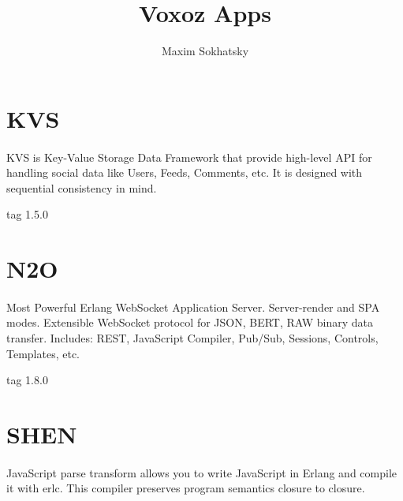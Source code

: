 \documentclass[11pt]{article}
\begin{document}
\title{Voxoz Apps}
\author{Maxim Sokhatsky}


\section*{KVS}
\paragraph{}
KVS is Key-Value Storage Data Framework that provide high-level API for handling
social data like Users, Feeds, Comments, etc. It is designed with sequential consistency in mind.

 tag 1.5.0


\section*{N2O}

\paragraph{}
Most Powerful Erlang WebSocket Application Server. Server-render and SPA modes.
Extensible WebSocket protocol for JSON, BERT, RAW binary data transfer.
Includes: REST, JavaScript Compiler, Pub/Sub, Sessions, Controls, Templates, etc.

 tag 1.8.0


\section*{SHEN}
\paragraph{}
JavaScript parse transform allows you to write JavaScript in Erlang and
compile it with erlc. This compiler preserves program semantics closure to closure.
\end{document}
